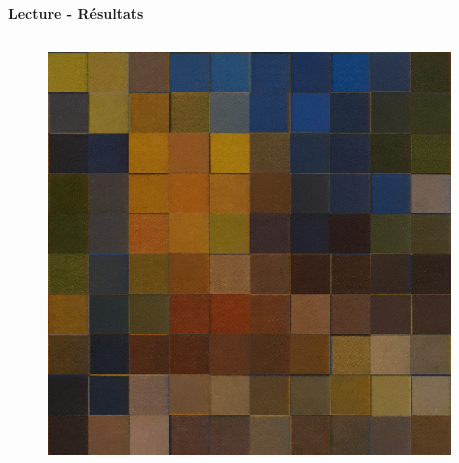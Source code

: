 \documentclass{beamer}
\begin{document}
\begin{frame}[t]
\begin{columns}[t]
\begin{column}{.49\linewidth}
\begin{block}{\centering \textbf{Lecture - Résultats}}
\begin{columns}[t]
                        \begin{column}{.2\linewidth}
                            \begin{figure}[t]
                                \hspace{.5cm}
                                \includegraphics[width=\linewidth]{rsc/van_gogh_picture_a_10_d.png}\\
                            \end{figure}
                        \end{column}

                        \begin{column}{.005\linewidth}

                        \end{column}


\end{columns}
\end{block}
\end{column}
\end{columns}
\end{frame}
\end{document}

